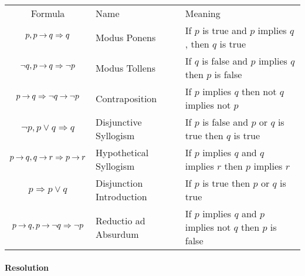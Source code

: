 \medskip
\begin{tabular}{c l l}
\label{Tab:RulesOfInference}
  Formula          & Name                  & Meaning      \\
  
  $p, p \mathbin{\rightarrow} q \Rightarrow q$                                  & 
  Modus Ponens                                                  & 
  If $p$ is true and $p$ implies $q$, then $q$ is true          \\   
  
  $\neg q, p \mathbin{\rightarrow} q \Rightarrow \neg p$                        & 
  Modus Tollens                                                 & 
  If $q$ is false and $p$ implies $q$ then $p$ is false         \\     
  
  $p \mathbin{\rightarrow} q \Rightarrow \neg q \mathbin{\rightarrow} \neg p$                  & 
  Contraposition                                               & 
  If $p$ implies $q$ then not $q$ implies not $p$              \\   
  
  $\neg p, p \vee q \Rightarrow q$                              & 
  Disjunctive Syllogism                                         & 
  If $p$ is false and $p$ or $q$ is true then $q$ is true       \\ 
  
  $p \mathbin{\rightarrow} q,  q \mathbin{\rightarrow} r \Rightarrow p \mathbin{\rightarrow} r$                 & 
  Hypothetical Syllogism                                        & 
  If $p$ implies $q$ and $q$ implies $r$ then $p$ implies $r$   \\   
  
  
  $p \Rightarrow p \vee q$                 & 
  Disjunction Introduction                                      & 
  If $p$ is true then $p$ or $q$ is true   \\    
  
  
  
  
  $p \mathbin{\rightarrow} q, p \mathbin{\rightarrow} \neg q \Rightarrow \neg p$                & 
  Reductio ad Absurdum                                          & 
  If $p$ implies $q$ and $p$ implies not $q$ then $p$ is false  \\ 
  
\end{tabular}
\medskip

\paragraph{Resolution}

